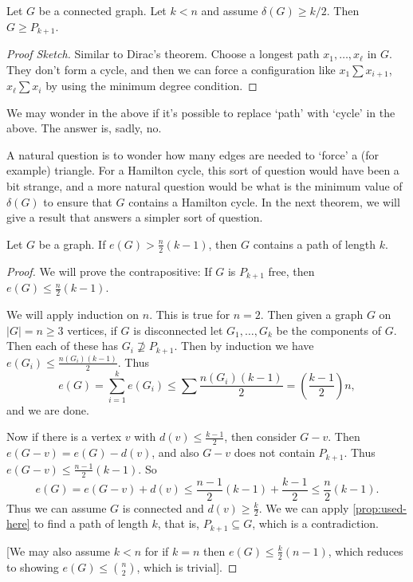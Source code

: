 \begin{proposition}\label{prop:used-here}
	Let $G$ be a connected graph. Let $k < n$ and assume $\delta(G) \geq k/2$. Then $G \geq P_{k + 1}$.
\end{proposition}
\begin{proof}[Proof Sketch]
	Similar to Dirac's theorem. Choose a longest path $x_1, \dots, x_\ell$ in $G$. They don't form a cycle, and then we can force a configuration like $x_1 \sum x_{i + 1}$, $x_{\ell} \sum x_i$ by using the minimum degree condition.
\end{proof}

We may wonder in the above if it's possible to replace `path' with `cycle' in the above. The answer is, sadly, no.

A natural question is to wonder how many edges are needed to `force' a (for example) triangle.
For a Hamilton cycle, this sort of question would have been a bit strange, and a more natural question would be what is the minimum value of $\delta(G)$ to ensure that $G$ contains a Hamilton cycle.
In the next theorem, we will give a result that answers a simpler sort of question.

\begin{theorem}
	Let $G$ be a graph. If $e(G) > \frac{n}{2}(k - 1)$, then $G$ contains a path of length $k$.
\end{theorem}
\begin{proof}
	We will prove the contrapositive: If $G$ is $P_{k + 1}$ free, then $e(G) \leq \frac{n}{2}(k - 1)$.

	We will apply induction on $n$. This is true for $n = 2$.
	Then given a graph $G$ on $|G| = n \geq 3$ vertices, if $G$ is disconnected let $G_1, \dots, G_k$ be the components of $G$. Then each of these has $G_i \not \supseteq P_{k + 1}$. Then by induction we have $e(G_i) \leq \frac{n(G_i)(k - 1)}{2}$. Thus
	$$
	e(G) = \sum_{i = 1}^k e(G_i) \leq \sum \frac{n(G_i)(k - 1)}{2} = \left(\frac{k - 1}{2}\right)n,
	$$
	and we are done.

	Now if there is a vertex $v$ with $d(v) \leq \frac{k - 1}{2}$, then consider $G - v$. Then $e(G - v) = e(G) - d(v)$, and also $G - v$ does not contain $P_{k + 1}$. Thus $e(G - v) \leq \frac{n - 1}{2}(k - 1)$. So
	$$
	e(G) = e(G - v) + d(v) \leq \frac{n - 1}{2}(k - 1) + \frac{k -1}{2} \leq \frac{n}{2}(k - 1).
	$$
	Thus we can assume $G$ is connected and $d(v)  \geq \frac{k}{2}$.
	We we can apply \autoref{prop:used-here} to find a path of length $k$, that is, $P_{k + 1} \subseteq G$, which is a contradiction.

	[We may also assume $k < n$ for if $k = n$ then $e(G) \leq \frac{k}{2}(n - 1)$, which reduces to showing $e(G) \leq \binom{n}{2}$, which is trivial].
\end{proof}

